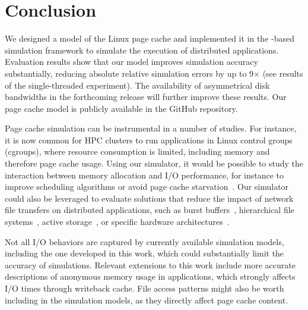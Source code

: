 \chapter{Conclusion}
\label{conclusion}

We designed a model of the Linux page cache and implemented it in the
\simgrid-based \wrench simulation framework to simulate the execution
of distributed applications.
Evaluation results show that our model improves simulation accuracy
substantially, reducing absolute relative simulation errors by up to
9$\times$ (see results of the single-threaded experiment). The
availability of asymmetrical disk bandwidths in the forthcoming
\simgrid release will further improve these results.
Our page cache model is publicly available in the \wrench GitHub
repository.

Page cache simulation can be instrumental in a number of studies. For
instance, it is now common for HPC clusters to run applications in
Linux control groups (cgroups), where resource consumption is limited,
including memory and therefore page cache usage. Using our simulator,
it would be possible to study the interaction between memory allocation
and I/O performance, for instance to improve scheduling algorithms or
avoid page cache starvation~\cite{zhuang2017}. Our simulator could also
be leveraged to evaluate solutions that reduce the impact of network
file transfers on distributed applications, such as burst
buffers~\cite{ferreiradasilva-fgcs-bb-2019}, hierarchical file
systems~\cite{islam2015triple}, active storage~\cite{5496981}, or
specific hardware architectures~\cite{hayot2020performance}. 

Not all I/O behaviors are captured by currently available simulation models,
including the one developed in this work, 
which could substantially limit the accuracy of simulations.
Relevant extensions to this work include more
accurate descriptions of anonymous memory usage in applications, 
which strongly affects I/O times through writeback cache. File access patterns
 might also be worth including in the simulation models,
as they directly affect page cache content.

